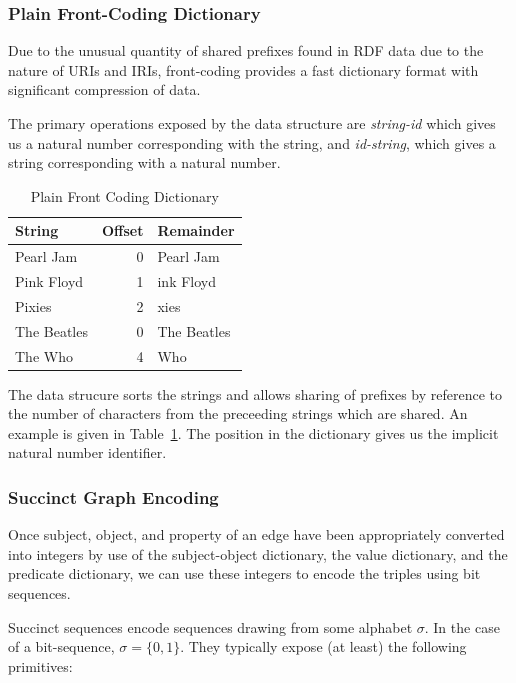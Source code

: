 \documentclass[10pt, a4paper, twocolumn]{article} %
\begin{document}
\subsubsection{Plain Front-Coding Dictionary}

Due to the unusual quantity of shared prefixes found in RDF data due
to the nature of URIs and IRIs, front-coding provides a fast
dictionary format with significant compression of
data\cite{MARTINEZPRIETO201673}.

The primary operations exposed by the data structure are {\em
  string-id} which gives us a natural number corresponding with the
string, and {\em id-string}, which gives a string corresponding with a
natural number.

\begin{table}
	\centering
	\begin{tabular}{l|rl}
		\toprule
		String & Offset & Remainder \\
		\midrule
        Pearl Jam & 0 & Pearl Jam \\
        Pink Floyd & 1 & ink Floyd \\
        Pixies & 2 & xies \\
		The Beatles & 0 & The Beatles \\
		The Who & 4 & Who \\
		\bottomrule
	\end{tabular}
    \caption{Plain Front Coding Dictionary}
    \label{tab:pfc}
\end{table}

The data strucure sorts the strings and allows sharing of prefixes by
reference to the number of characters from the preceeding strings
which are shared. An example is given in Table~\ref{tab:pfc}. The
position in the dictionary gives us the implicit natural number
identifier.

\subsubsection{Succinct Graph Encoding}

Once subject, object, and property of an edge have been appropriately
converted into integers by use of the subject-object dictionary, the
value dictionary, and the predicate dictionary, we can use these
integers to encode the triples using bit sequences.

Succinct sequences encode sequences drawing from some alphabet
\(\sigma\). In the case of a bit-sequence, \(\sigma=\{0,1\}\). They
typically expose (at least) the following primitives:
\end{document}
